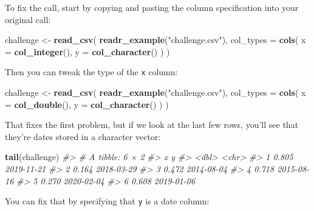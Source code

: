 \documentclass[]{book}
\newenvironment{Shaded}{\begin{snugshade}}{\end{snugshade}}
\newcommand{\KeywordTok}[1]{\textcolor[rgb]{0.13,0.29,0.53}{\textbf{{#1}}}}
\newcommand{\DataTypeTok}[1]{\textcolor[rgb]{0.13,0.29,0.53}{{#1}}}
\newcommand{\StringTok}[1]{\textcolor[rgb]{0.31,0.60,0.02}{{#1}}}
\newcommand{\CommentTok}[1]{\textcolor[rgb]{0.56,0.35,0.01}{\textit{{#1}}}}
\newcommand{\NormalTok}[1]{{#1}}
\begin{document}
To fix the call, start by copying and pasting the column specification
into your original call:

\begin{Shaded}
\begin{Highlighting}[]
\NormalTok{challenge <-}\StringTok{ }\KeywordTok{read_csv}\NormalTok{(}
  \KeywordTok{readr_example}\NormalTok{(}\StringTok{"challenge.csv"}\NormalTok{), }
  \DataTypeTok{col_types =} \KeywordTok{cols}\NormalTok{(}
    \DataTypeTok{x =} \KeywordTok{col_integer}\NormalTok{(),}
    \DataTypeTok{y =} \KeywordTok{col_character}\NormalTok{()}
  \NormalTok{)}
\NormalTok{)}
\end{Highlighting}
\end{Shaded}

Then you can tweak the type of the \texttt{x} column:

\begin{Shaded}
\begin{Highlighting}[]
\NormalTok{challenge <-}\StringTok{ }\KeywordTok{read_csv}\NormalTok{(}
  \KeywordTok{readr_example}\NormalTok{(}\StringTok{"challenge.csv"}\NormalTok{), }
  \DataTypeTok{col_types =} \KeywordTok{cols}\NormalTok{(}
    \DataTypeTok{x =} \KeywordTok{col_double}\NormalTok{(),}
    \DataTypeTok{y =} \KeywordTok{col_character}\NormalTok{()}
  \NormalTok{)}
\NormalTok{)}
\end{Highlighting}
\end{Shaded}

That fixes the first problem, but if we look at the last few rows,
you'll see that they're dates stored in a character vector:

\begin{Shaded}
\begin{Highlighting}[]
\KeywordTok{tail}\NormalTok{(challenge)}
\CommentTok{#> # A tibble: 6 × 2}
\CommentTok{#>       x          y}
\CommentTok{#>   <dbl>      <chr>}
\CommentTok{#> 1 0.805 2019-11-21}
\CommentTok{#> 2 0.164 2018-03-29}
\CommentTok{#> 3 0.472 2014-08-04}
\CommentTok{#> 4 0.718 2015-08-16}
\CommentTok{#> 5 0.270 2020-02-04}
\CommentTok{#> 6 0.608 2019-01-06}
\end{Highlighting}
\end{Shaded}

You can fix that by specifying that \texttt{y} is a date column:
\end{document}
